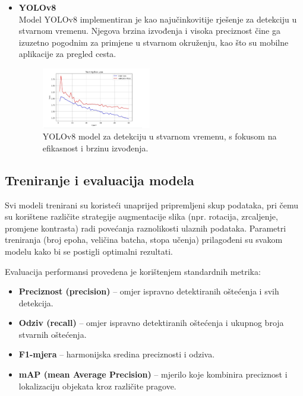 \documentclass[conference]{IEEEtran}
\begin{document}
\begin{itemize}
    \item \textbf{YOLOv8} \\
    Model YOLOv8 implementiran je kao najučinkovitije rješenje za detekciju u stvarnom vremenu. Njegova brzina izvođenja i visoka preciznost čine ga izuzetno pogodnim za primjene u stvarnom okruženju, kao što su mobilne aplikacije za pregled cesta.
    \begin{figure}[htbp]
    \centerline{\includegraphics[width=0.45\textwidth]{Images/YOLO.jpg}}
    \caption{YOLOv8 model za detekciju u stvarnom vremenu, s fokusom na efikasnost i brzinu izvođenja.}
    \label{fig:yolo}
    \end{figure}
\end{itemize}

\subsection{Treniranje i evaluacija modela}
\label{sub:treniranje_evaluacija}

Svi modeli trenirani su koristeći unaprijed pripremljeni skup podataka, pri čemu su korištene različite strategije augmentacije slika (npr. rotacija, zrcaljenje, promjene kontrasta) radi povećanja raznolikosti ulaznih podataka. Parametri treniranja (broj epoha, veličina batcha, stopa učenja) prilagođeni su svakom modelu kako bi se postigli optimalni rezultati.

Evaluacija performansi provedena je korištenjem standardnih metrika:

\begin{itemize}
    \item \textbf{Preciznost (precision)} – omjer ispravno detektiranih oštećenja i svih detekcija.
    \item \textbf{Odziv (recall)} – omjer ispravno detektiranih oštećenja i ukupnog broja stvarnih oštećenja.
    \item \textbf{F1-mjera} – harmonijska sredina preciznosti i odziva.
    \item \textbf{mAP (mean Average Precision)} – mjerilo koje kombinira preciznost i lokalizaciju objekata kroz različite pragove.
\end{itemize}
\end{document}
